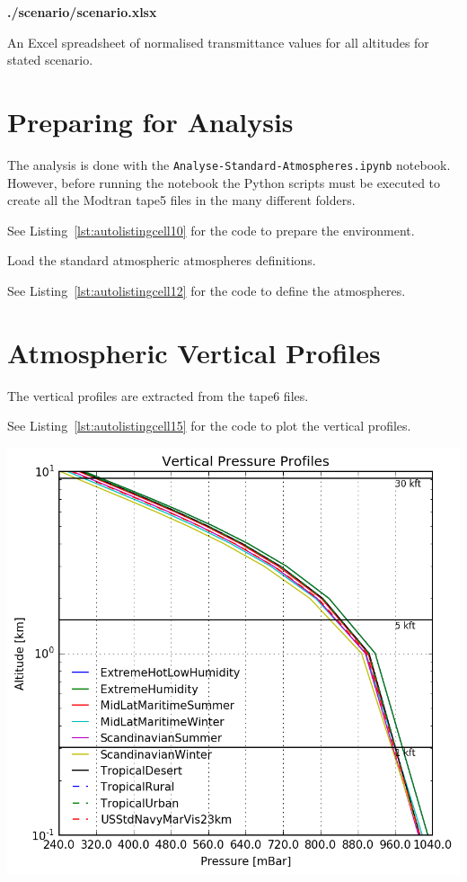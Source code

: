 \documentclass{workpackage}
\begin{document}
\textbf{./scenario/scenario.xlsx}


An Excel spreadsheet of normalised transmittance values for all altitudes for stated scenario.


\section{Preparing for Analysis}
\label{sec:PreparingforAnalysis}

The analysis is done with the  \lstinline{Analyse-Standard-Atmospheres.ipynb} notebook. 
However, before running the notebook the Python scripts must be executed to create all the Modtran tape5 files in the many different folders.

See Listing~\ref{lst:autolistingcell10} for the code to prepare the environment.

Load the standard atmospheric atmospheres definitions.




See Listing~\ref{lst:autolistingcell12} for the code to define the atmospheres.


\section{Atmospheric Vertical Profiles}
\label{sec:AtmosphericVerticalProfiles}

The vertical profiles are extracted from the tape6 files.




See Listing~\ref{lst:autolistingcell15} for the code to plot the vertical profiles.

\begin{center}
\includegraphics{./pic/Analyse-Standard-Atmospheres_15_0.png}
\end{center}
\end{document}
